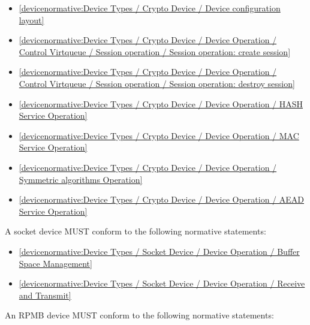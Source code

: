 \begin{itemize}
\item \ref{devicenormative:Device Types / Crypto Device / Device configuration layout}
\item \ref{devicenormative:Device Types / Crypto Device / Device Operation / Control Virtqueue / Session operation / Session operation: create session}
\item \ref{devicenormative:Device Types / Crypto Device / Device Operation / Control Virtqueue / Session operation / Session operation: destroy session}
\item \ref{devicenormative:Device Types / Crypto Device / Device Operation / HASH Service Operation}
\item \ref{devicenormative:Device Types / Crypto Device / Device Operation / MAC Service Operation}
\item \ref{devicenormative:Device Types / Crypto Device / Device Operation / Symmetric algorithms Operation}
\item \ref{devicenormative:Device Types / Crypto Device / Device Operation / AEAD Service Operation}
\end{itemize}

\label{sec:Conformance / Device Conformance / Socket Device Conformance}

A socket device MUST conform to the following normative statements:

\begin{itemize}
\item \ref{devicenormative:Device Types / Socket Device / Device Operation / Buffer Space Management}
\item \ref{devicenormative:Device Types / Socket Device / Device Operation / Receive and Transmit}
\end{itemize}

\label{sec:Conformance / Device Conformance / RPMB Device Conformance}

An RPMB device MUST conform to the following normative statements:

